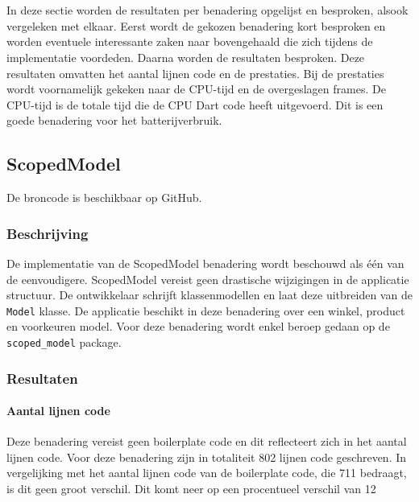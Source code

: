 

\chapter{}
\label{ch:experiment}

In deze sectie worden de resultaten per benadering opgelijst en besproken, alsook vergeleken met elkaar. Eerst wordt de gekozen benadering kort besproken en worden eventuele interessante zaken naar bovengehaald die zich tijdens de implementatie voordeden. Daarna worden de resultaten besproken. Deze resultaten omvatten het aantal lijnen code en de prestaties. \newline \newline Bij de prestaties wordt voornamelijk gekeken naar de CPU-tijd en de overgeslagen frames. De CPU-tijd is de totale tijd die de CPU Dart code heeft uitgevoerd. Dit is een goede benadering voor het batterijverbruik.


\section{ScopedModel}
De broncode is beschikbaar op GitHub. \autocite{DeVrient2019a}
\subsection{Beschrijving}
De implementatie van de ScopedModel benadering wordt beschouwd als één van de eenvoudigere. ScopedModel vereist geen drastische wijzigingen in de applicatie structuur. De ontwikkelaar schrijft klassenmodellen en laat deze uitbreiden van de \verb|Model| klasse. De applicatie beschikt in deze benadering over een winkel, product en voorkeuren model. \newline \newline
Voor deze benadering wordt enkel beroep gedaan op de \verb|scoped_model| package. 


\subsection{Resultaten}
\subsubsection{Aantal lijnen code}
Deze benadering vereist geen boilerplate code en dit reflecteert zich in het aantal lijnen code. Voor deze benadering zijn in totaliteit 802 lijnen code geschreven. In vergelijking met het aantal lijnen code van de boilerplate code, die 711 bedraagt, is dit geen groot verschil. Dit komt neer op een procentueel verschil van 12%

